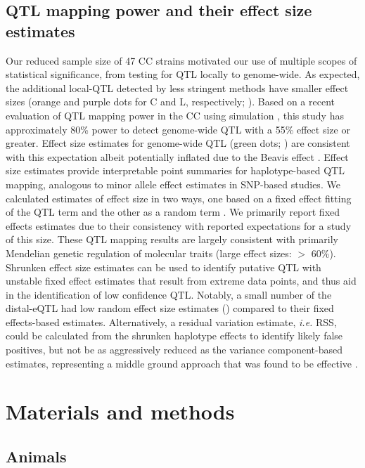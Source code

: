 \documentclass[10pt,letterpaper]{article}
\newcommand{\ie}{\emph{i.e.}\xspace}
\begin{document}
\subsection*{QTL mapping power and their effect size estimates}
Our reduced sample size of 47 CC strains motivated our use of multiple scopes of statistical significance, from testing for QTL locally to genome-wide. As expected, the additional local-QTL detected by less stringent methods have smaller effect sizes (orange and purple dots for C and L, respectively; ). Based on a recent evaluation of QTL mapping power in the CC using simulation \cite{Keele2019}, this study has approximately 80\% power to detect genome-wide QTL with a 55\% effect size or greater. Effect size estimates for genome-wide QTL (green dots; ) are consistent with this expectation albeit potentially inflated due to the Beavis effect \cite{Xu2003}. 
Effect size estimates provide interpretable point summaries for haplotype-based QTL mapping, analogous to minor allele effect estimates in SNP-based studies. We calculated estimates of effect size in two ways, one based on a fixed effect fitting of the QTL term and the other as a random term \cite{Wei2016}. 
We primarily report fixed effects estimates due to their consistency with reported expectations \cite{Keele2019} for a study of this size. %
These QTL mapping results are largely consistent with primarily Mendelian genetic regulation of molecular traits (large effect sizes: $>$ 60\%).
Shrunken effect size estimates can be used to identify putative QTL with unstable fixed effect estimates that result from extreme data points, and thus aid in the identification of low confidence QTL. Notably, a small number of the distal-eQTL had low random effect size estimates () compared to their fixed effects-based estimates. Alternatively, a residual variation estimate, \ie RSS, could be calculated from the shrunken haplotype effects to identify likely false positives, but not be as aggressively reduced as the variance component-based estimates, representing a middle ground approach that was found to be effective \cite{Keele2018}.

\section*{Materials and methods}

\subsection*{Animals}
\end{document}
